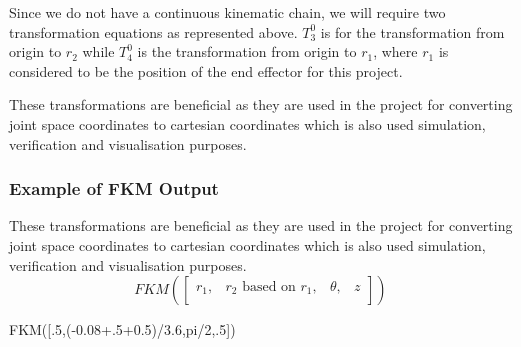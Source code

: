 \documentclass{UoNMCHA}
\numberwithin{equation}{section}
\begin{document}
	Since we do not have a continuous kinematic chain, we will require two transformation equations as represented above. $T_3^0$ is for the transformation from origin to $r_2$ while $T_4^0$ is the transformation from origin to $r_1$, where $r_1$ is considered to be the position of the end effector for this project. \par
	These transformations are beneficial as they are used in the project for converting joint space coordinates to cartesian coordinates which is also used simulation, verification and visualisation purposes.
	
	\subsubsection*{Example of FKM Output}
		
	These transformations are beneficial as they are used in the project for converting joint space coordinates to cartesian coordinates which is also used simulation, verification and visualisation purposes.  \\
	
	\begin{equation*}
	FKM (\begin{bmatrix}
	r_1 ,& r_2 \text{ based on }r_1 , & \theta , & z \\
	\end{bmatrix} )
	\end{equation*}

	\begin{center} 
		FKM([.5,(-0.08+.5+0.5)/3.6,pi/2,.5])
	\end{center}
		
\end{document}
